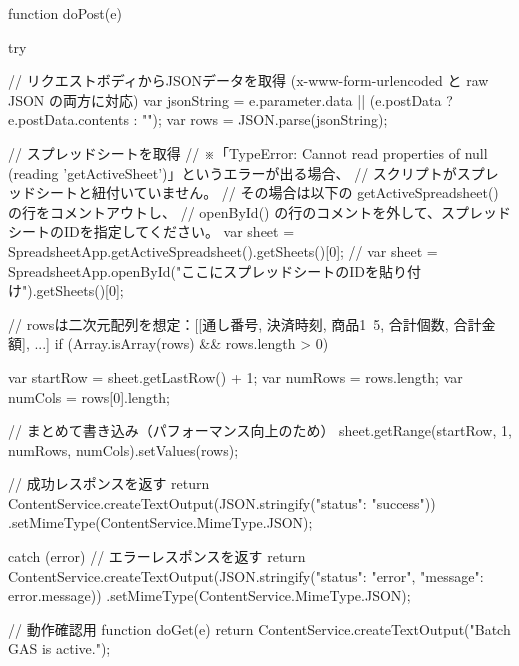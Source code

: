 function doPost(e) {
  try {
    // リクエストボディからJSONデータを取得 (x-www-form-urlencoded と raw JSON の両方に対応)
    var jsonString = e.parameter.data || (e.postData ? e.postData.contents : "");
    var rows = JSON.parse(jsonString);
    
    // スプレッドシートを取得
    // ※「TypeError: Cannot read properties of null (reading 'getActiveSheet')」というエラーが出る場合、
    // スクリプトがスプレッドシートと紐付いていません。
    // その場合は以下の getActiveSpreadsheet() の行をコメントアウトし、
    // openById() の行のコメントを外して、スプレッドシートのIDを指定してください。
    var sheet = SpreadsheetApp.getActiveSpreadsheet().getSheets()[0];
    // var sheet = SpreadsheetApp.openById("ここにスプレッドシートのIDを貼り付け").getSheets()[0];
    
    // rowsは二次元配列を想定：[[通し番号, 決済時刻, 商品1~5, 合計個数, 合計金額], ...]
    if (Array.isArray(rows) && rows.length > 0) {
      var startRow = sheet.getLastRow() + 1;
      var numRows = rows.length;
      var numCols = rows[0].length;
      
      // まとめて書き込み（パフォーマンス向上のため）
      sheet.getRange(startRow, 1, numRows, numCols).setValues(rows);
    }
    
    // 成功レスポンスを返す
    return ContentService.createTextOutput(JSON.stringify({"status": "success"}))
      .setMimeType(ContentService.MimeType.JSON);
      
  } catch (error) {
    // エラーレスポンスを返す
    return ContentService.createTextOutput(JSON.stringify({"status": "error", "message": error.message}))
      .setMimeType(ContentService.MimeType.JSON);
  }
}

// 動作確認用
function doGet(e) {
  return ContentService.createTextOutput("Batch GAS is active.");
}
